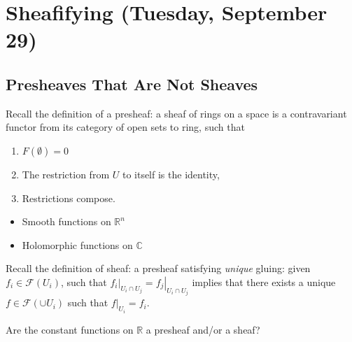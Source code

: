 \hypertarget{sheafifying-tuesday-september-29}{%
\section{Sheafifying (Tuesday, September
29)}\label{sheafifying-tuesday-september-29}}

\hypertarget{presheaves-that-are-not-sheaves}{%
\subsection{Presheaves That Are Not
Sheaves}\label{presheaves-that-are-not-sheaves}}

Recall the definition of a presheaf: a sheaf of rings on a space is a
contravariant functor from its category of open sets to ring, such that

\begin{enumerate}
\def\labelenumi{\arabic{enumi}.}
\tightlist
\item
  \(F(\emptyset) = 0\)
\item
  The restriction from \(U\) to itself is the identity,
\item
  Restrictions compose.
\end{enumerate}

\begin{example}[?]

\envlist

\begin{itemize}
\tightlist
\item
  Smooth functions on \({\mathbb{R}}^n\)
\item
  Holomorphic functions on \({\mathbb{C}}\)
\end{itemize}

\end{example}

Recall the definition of sheaf: a presheaf satisfying \emph{unique}
gluing: given \(f_i \in \mathcal{F}(U_i)\), such that
\({\left.{{f_i}} \right|_{{U_i \cap U_j}} } = {\left.{{f_j}} \right|_{{U_i\cap U_j}} }\)
implies that there exists a unique \(f\in \mathcal{F}(\cup U_i)\) such
that \({\left.{{f}} \right|_{{U_i}} } = f_i\).

\begin{question}

Are the constant functions on \({\mathbb{R}}\) a presheaf and/or a
sheaf?

\end{question}

